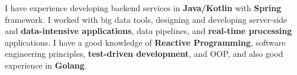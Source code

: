 

\begin{cvparagraph}

I have experience developing backend services in \textbf{Java/Kotlin} with \textbf{Spring} framework.
I worked with big data tools, designing and developing server-side and \textbf{data-intensive applications}, data pipelines, and \textbf{real-time processing} applications.
I have a good knowledge of \textbf{Reactive Programming}, software engineering principles, \textbf{test-driven development}, and OOP, and also good experience in \textbf{Golang}.
\end{cvparagraph}